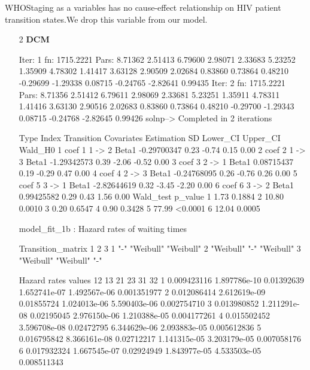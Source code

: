\documentclass[11pt,a4paper]{article}
\begin{document}
WHOStaging as a variables has no cause-effect relationship on HIV patient transition states.We drop this variable from our model.\\
\begin{enumerate}
  \item[2] \textbf{DCM}
\begin{Schunk}
\begin{Soutput}
Iter: 1 fn: 1715.2221	 Pars:   8.71362  2.51413  6.79600  2.98071  2.33683  5.23252  1.35909  4.78302  1.41417  3.63128  2.90509  2.02684  0.83860  0.73864  0.48210 -0.29699 -1.29338  0.08715 -0.24765 -2.82641  0.99435
Iter: 2 fn: 1715.2221	 Pars:   8.71356  2.51412  6.79611  2.98069  2.33681  5.23251  1.35911  4.78311  1.41416  3.63130  2.90516  2.02683  0.83860  0.73864  0.48210 -0.29700 -1.29343  0.08715 -0.24768 -2.82645  0.99426
solnp--> Completed in 2 iterations
\end{Soutput}
\begin{Soutput}
  Type Index Transition Covariates  Estimation   SD Lower_CI Upper_CI Wald_H0
1 coef     1     1 -> 2      Beta1 -0.29700347 0.23    -0.74     0.15    0.00
2 coef     2     1 -> 3      Beta1 -1.29342573 0.39    -2.06    -0.52    0.00
3 coef     3     2 -> 1      Beta1  0.08715437 0.19    -0.29     0.47    0.00
4 coef     4     2 -> 3      Beta1 -0.24768095 0.26    -0.76     0.26    0.00
5 coef     5     3 -> 1      Beta1 -2.82644619 0.32    -3.45    -2.20    0.00
6 coef     6     3 -> 2      Beta1  0.99425582 0.29     0.43     1.56    0.00
  Wald_test p_value
1      1.73  0.1884
2     10.80  0.0010
3      0.20  0.6547
4      0.90  0.3428
5     77.99 <0.0001
6     12.04  0.0005
\end{Soutput}
\begin{Soutput}
model_fit_1b  : Hazard rates of waiting times

Transition_matrix
  1         2         3        
1 "-"       "Weibull" "Weibull"
2 "Weibull" "-"       "Weibull"
3 "Weibull" "Weibull" "-"      

Hazard rates values 
           12           13         21           23           31          32
1 0.009423116 1.897786e-10 0.01392639 1.652741e-07 1.492567e-06 0.001351977
2 0.012086414 2.612619e-09 0.01855724 1.024013e-06 5.590403e-06 0.002754710
3 0.013980852 1.211291e-08 0.02195045 2.976150e-06 1.210388e-05 0.004177261
4 0.015502452 3.596708e-08 0.02472795 6.344629e-06 2.093883e-05 0.005612836
5 0.016795842 8.366161e-08 0.02712217 1.141315e-05 3.203179e-05 0.007058176
6 0.017932324 1.667545e-07 0.02924949 1.843977e-05 4.533503e-05 0.008511343


\end{Soutput}
\end{Schunk}
\end{enumerate}
\end{document}
